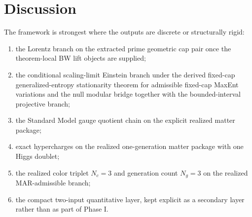 \documentclass[11pt]{article}
\begin{document}
\section{Discussion}

The framework is strongest where the outputs are discrete or structurally rigid:
\begin{enumerate}[leftmargin=2em]
\item the Lorentz branch on the extracted prime geometric cap pair once the theorem-local BW lift objects are supplied;
\item the conditional scaling-limit Einstein branch under the derived fixed-cap generalized-entropy stationarity theorem for admissible fixed-cap MaxEnt variations and the null modular bridge together with the bounded-interval projective branch;
\item the Standard Model gauge quotient chain on the explicit realized matter package;
\item exact hypercharges on the realized one-generation matter package with one Higgs doublet;
\item the realized color triplet \(N_c=3\) and generation count \(N_g=3\) on the realized MAR-admissible branch;
\item the compact two-input quantitative layer, kept explicit as a secondary layer rather than as part of Phase I.
\end{enumerate}
\end{document}
